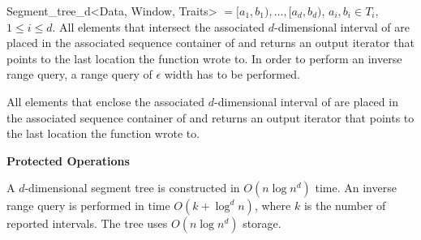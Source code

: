 \begin{ccRefClass} {Segment_tree_d<Data, Window, Traits>}
{ $=[a_1,b_1),\ldots , [a_d,b_d)$, $a_i,b_i\in T_i$, $1\le
    i\le d$. All elements that
  intersect the associated $d$-dimensional interval of
 are placed in the
associated sequence container of    and
returns an
output iterator that points
to the last location the function wrote to.
In order to perform an inverse range query, a range query of
$\epsilon$ width has to be performed.
}

%
{ All elements that
  enclose the associated $d$-dimensional interval of
 are placed in the
associated sequence container of    and returns an output iterator that points
to the last location the function wrote to.}


{\bf Protected Operations}




\ccImplementation

A $d$-dimensional segment tree is constructed in ${O}(n\log n^d)$ time.
An inverse range query is performed in time ${O}(k+{\log}^d n )$, where $k$
is the number of reported intervals.
The tree uses ${O}(n\log n^d)$ storage.
\end{ccRefClass}
